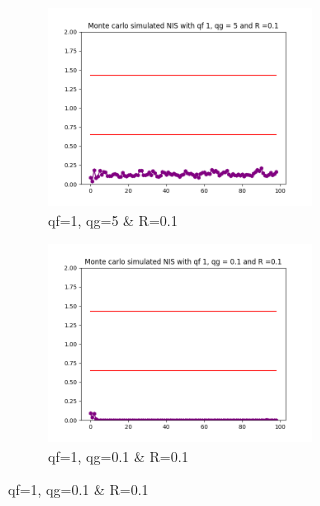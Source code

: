\documentclass{article}
\begin{document}
\begin{figure}[H]
\begin{subfigure} {1\textwidth}
                \begin{subfigure}{.3\textwidth}  
                    \includegraphics[width=1\linewidth]{./img/mc/acc/nis1_qg5_r01.png}
                    \caption{qf=1, qg=5 \& R=0.1 }
                \end{subfigure}
                \begin{subfigure}{.3\textwidth}
                    \includegraphics[width=1\linewidth]{./img/mc/acc/nis1_qg01_r01.png}
                    \caption{qf=1, qg=0.1 \& R=0.1}
                \end{subfigure}
            \end{subfigure} 
            \begin{subfigure} {1\textwidth}    

\end{subfigure}
\end{figure}
\end{document}
